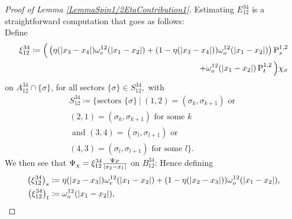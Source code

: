 \begin{proof}[Proof of Lemma \ref{LemmaSpin1/2EtaContribution1}]
Estimating $ E_{12}^{34} $ is a straightforward computation that goes as follows:\\
Define 
\begin{equation}
\begin{aligned}
\xi_{12}^{34}\coloneqq \Big(\left(\eta(\left\lvert x_3-x_4 \right\rvert)\omega^{12}_e(\left\lvert x_1-x_2 \right\rvert)+(1-\eta(\left\lvert x_3-x_4 \right\rvert))\omega^{12}_o(\left\lvert x_1-x_2 \right\rvert)\right)\operatorname{P}_s^{1,2}\\+\omega_o^{12}(\left\lvert x_1-x_2 \right\rvert)\operatorname{P}_t^{1,2}\Big)\chi_\sigma 
\end{aligned}
\end{equation} 
on $ A_{12}^{34}\cap \{\sigma\}$, for all sectors $ \{\sigma\}\in S_{12}^{34}, $ 
with \begin{equation}
\begin{aligned}
S_{12}^{34}\coloneqq\big\{\text{sectors } \{\sigma\}\ \vert \ (1,2)=(\sigma_k,\sigma_{k+1}) \text{ or }\\ (2,1)=(\sigma_k,\sigma_{k+1})\text{ for some } k\\
\text{ and } (3,4)=(\sigma_l,\sigma_{l+1}) \text{ or }\\ (4,3)=(\sigma_l,\sigma_{l+1})\text{ for some } l\big\}.
\end{aligned}
\end{equation} We then see that $\Psi_{\chi}=\xi_{12}^{34} \frac{\Psi_F}{\left\lvert x_2-x_1 \right\rvert}$ on $ B_{12}^{34} $: Hence defining \begin{equation}
\begin{aligned}
\left(\xi_{12}^{34}\right)_s&\coloneqq \eta(\left\lvert x_2-x_3 \right\rvert)\omega^{12}_e(\left\lvert x_1-x_2 \right\rvert)+(1-\eta(\left\lvert x_2-x_3 \right\rvert))\omega^{12}_o(\left\lvert x_1-x_2 \right\rvert),\\
\left(\xi_{12}^{34}\right)_t&\coloneqq \omega_o^{12}(\left\lvert x_1-x_2 \right\rvert),
\end{aligned}
\end{equation}


\end{proof}
